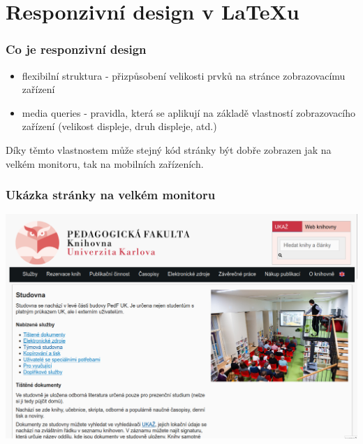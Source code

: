 \section{Responzivní design v \LaTeX u}

\begin{frame}
   \frametitle{Co je responzivní design}
   \begin{itemize}
     \item flexibilní struktura - přizpůsobení velikosti prvků na stránce zobrazovacímu zařízení
     \item media queries - pravidla, která se aplikují na základě vlastností zobrazovacího zařízení (velikost displeje, druh displeje, atd.) 
   \end{itemize}

   Díky těmto vlastnostem může stejný kód stránky být dobře zobrazen jak na velkém monitoru, tak na mobilních zařízeních.
\end{frame}

\begin{frame}
  \frametitle{Ukázka stránky na velkém monitoru}
  \begin{center}
    \includegraphics[height=.9\textheight]{img/pedf-web-big.png}
  \end{center}
\end{frame}


